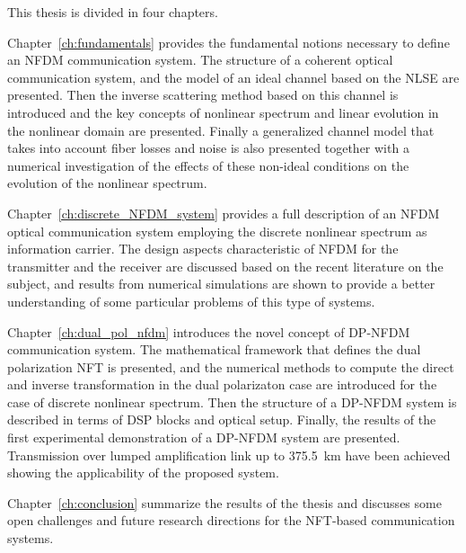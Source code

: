 This thesis is divided in four chapters.

Chapter~\ref{ch:fundamentals} provides the fundamental notions necessary to define an \ac{NFDM} communication system. The structure of a coherent
optical communication system, and the model of an ideal channel based on the \ac{NLSE} are presented. Then the inverse scattering method based on this channel is introduced and the key concepts of nonlinear spectrum and linear evolution in the nonlinear domain are presented. Finally a generalized channel model that takes into account fiber losses and noise is also presented together with a numerical investigation of the effects of these non-ideal conditions on the evolution of the nonlinear spectrum.

Chapter~\ref{ch:discrete_NFDM_system} provides a full description of an \ac{NFDM} optical communication system employing the discrete nonlinear spectrum as information carrier. The design aspects characteristic of \ac{NFDM} for the transmitter and the receiver are discussed based on the recent literature on the subject, and results from numerical simulations are shown to provide a better understanding of some particular problems of this type of systems.

Chapter~\ref{ch:dual_pol_nfdm} introduces the novel concept of \ac{DP-NFDM} communication system. The mathematical framework that defines the dual polarization \ac{NFT} is presented, and the numerical methods to compute the direct and inverse transformation in the dual polarizaton case are introduced for the case of discrete nonlinear spectrum. Then the structure of a \ac{DP-NFDM} system is described in terms of \ac{DSP} blocks and optical setup. Finally, the results of the first experimental demonstration of a \ac{DP-NFDM} system are presented. Transmission over lumped amplification link up to \SI{375.5}{km} have been achieved showing the applicability of the proposed system.

Chapter~\ref{ch:conclusion} summarize the results of the thesis and discusses some open challenges and future research directions for the \ac{NFT}-based communication systems.
